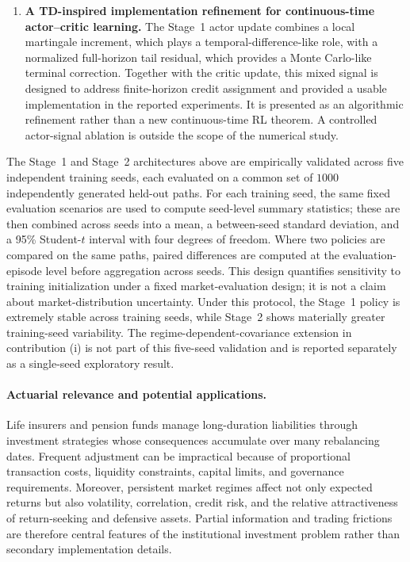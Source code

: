 \documentclass[a4paper,10pt]{article}
\begin{document}
\begin{enumerate}[label=(\roman*)]
\item \textbf{A TD-inspired implementation refinement for continuous-time actor--critic learning.}
The Stage~1 actor update combines a local martingale increment, which plays a temporal-difference-like role, with a normalized full-horizon tail residual, which provides a Monte Carlo-like terminal correction. Together with the critic update, this mixed signal is designed to address finite-horizon credit assignment and provided a usable implementation in the reported experiments. It is presented as an algorithmic refinement rather than a new continuous-time RL theorem. A controlled actor-signal ablation is outside the scope of the numerical study.
\end{enumerate}

The Stage~1 and Stage~2 architectures above are empirically validated across five independent training seeds, each evaluated on a common set of $1000$ independently generated held-out paths. For each training seed, the same fixed evaluation scenarios are used to compute seed-level summary statistics; these are then combined across seeds into a mean, a between-seed standard deviation, and a 95\% Student-$t$ interval with four degrees of freedom. Where two policies are compared on the same paths, paired differences are computed at the evaluation-episode level before aggregation across seeds. This design quantifies sensitivity to training initialization under a fixed market-evaluation design; it is not a claim about market-distribution uncertainty. Under this protocol, the Stage~1 policy is extremely stable across training seeds, while Stage~2 shows materially greater training-seed variability. The regime-dependent-covariance extension in contribution (i) is not part of this five-seed validation and is reported separately as a single-seed exploratory result.

\label{sec:actuarial}
\paragraph{Actuarial relevance and potential applications.}
Life insurers and pension funds manage long-duration liabilities through
investment strategies whose consequences accumulate over many rebalancing
dates. Frequent adjustment can be impractical because of proportional
transaction costs, liquidity constraints, capital limits, and governance
requirements. Moreover, persistent market regimes affect not only expected
returns but also volatility, correlation, credit risk, and the relative
attractiveness of return-seeking and defensive assets. Partial information
and trading frictions are therefore central features of the institutional
investment problem rather than secondary implementation details.
\end{document}
